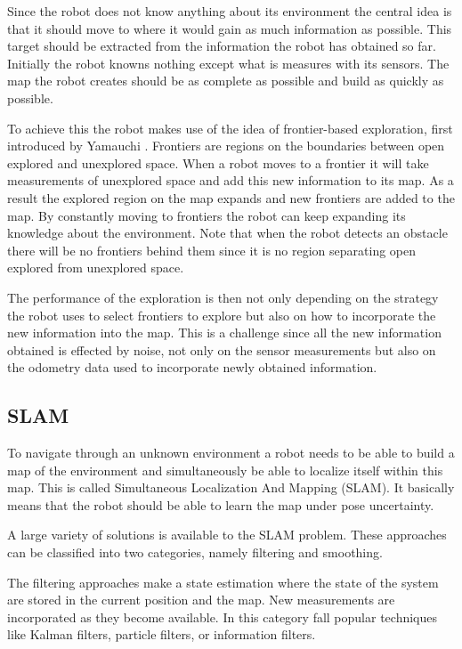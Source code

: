 \documentclass{ba-kecs}
\begin{document}
Since the robot does not know anything about its environment the central idea is that it should move to where it would gain as much information as possible. This target should be extracted from the information the robot has obtained so far. Initially the robot knowns nothing except what is measures with its sensors. The map the robot creates should be as complete as possible and build as quickly as possible.

To achieve this the robot makes use of the idea of frontier-based exploration, first introduced by Yamauchi \cite{Yamauchi}. Frontiers are regions on the boundaries between open explored and unexplored space. When a robot moves to a frontier it will take measurements of unexplored space and add this new information to its map. As a result the explored region on the map expands and new frontiers are added to the map. By constantly moving to frontiers the robot can keep expanding its knowledge about the environment. Note that when the robot detects an obstacle there will be no frontiers behind them since it is no region separating open explored from unexplored space.

The performance of the exploration is then not only depending on the strategy the robot uses to select frontiers to explore but also on how to incorporate the new information into the map. This is a challenge since all the new information obtained is effected by noise, not only on the sensor measurements but also on the odometry data used to incorporate newly obtained information.

\subsection{SLAM}
To navigate through an unknown environment a robot needs to be able to build a map of the environment and simultaneously be able to localize itself within this map. This is called Simultaneous Localization And Mapping (SLAM). It basically means that the robot should be able to learn the map under pose uncertainty.

A large variety of solutions is available to the SLAM problem. These approaches can be classified into two categories, namely filtering and smoothing. 

The filtering approaches make a state estimation where the state of the system are stored in the current position and the map. New measurements are incorporated as they become available. In this category fall popular techniques like Kalman filters, particle filters, or information filters.
\end{document}

